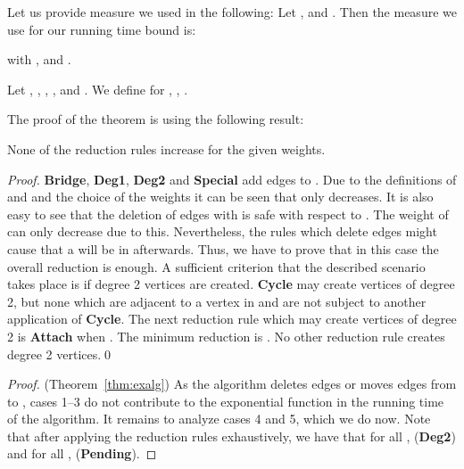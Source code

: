 \documentclass{llncs}
\newcommand{\longversion}[1]{#1}
\newcommand{\shortversion}[1]{}
\begin{document}
{\shortversion{The proof is omitted for reasons of space, but we will}\longversion{Let us} provide measure we used in the following:
Let ,  and . 
Then the measure we use for our running time bound is:

with     ,     and     .\longversion{

Let , , , ,  and . We define  for , 
, .}
\longversion{
 }
The proof of the theorem is using the following result:

\begin{lemma}\label{noinc}
None of the reduction rules increase  for the given weights.
\end{lemma}

\longversion{
\begin{proof}
{\bf Bridge}, {\bf Deg1}, {\bf Deg2} and {\bf Special} add edges to . Due to the definitions of  and  and the
 choice of the weights it can be seen that  only decreases. It is also easy to see that the deletion of edges  with  is
safe with respect to . The weight of  can only decrease due to this. Nevertheless, the rules which delete edges might cause that a  will be in  afterwards. Thus, we have to prove that in this case the overall reduction is enough. A
sufficient criterion that the described scenario takes place is if degree 2 vertices are created. {\bf Cycle} may create vertices of degree 2, but
none which are adjacent to a vertex in  and are not subject to another application of {\bf Cycle}. The next reduction
rule which may create vertices of degree 2 is {\bf Attach} when . The minimum reduction is . No other reduction rule creates degree 2 vertices.\qed
\end{proof}

\begin{proof} (Theorem~\ref{thm:exalg}) 
As the algorithm deletes edges or moves edges from  to , cases 1--3 do not contribute to the exponential function in the running time of the algorithm. It remains to analyze cases 4 and 5, which we do now. Note that after applying the reduction rules exhaustively, we have that for all ,  ({\bf Deg2}) and for all ,  ({\bf Pending}).



\end{proof}}}
\end{document}
